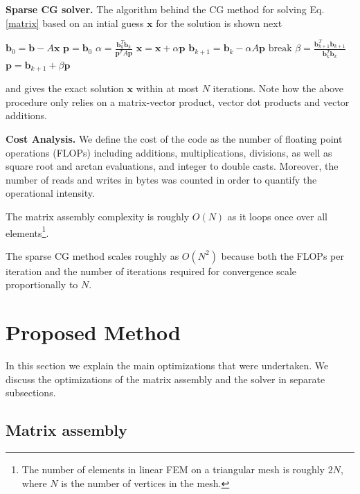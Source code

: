 \documentclass[letterpaper]{article}
\newcommand{\mypar}[1]{{\bf #1.}}
\begin{document}
\mypar{Sparse CG solver}
The algorithm behind the CG method for solving Eq. \eqref{matrix} based on an intial guess $\mathbf{x}$ for the solution is shown next
\begin{algorithmic}
\State $\mathbf{b}_0 = \mathbf{b}-A\mathbf{x}$
\State $\mathbf{p}   = \mathbf{b}_0$ 
\State $\alpha = \frac{\mathbf{b}_k^T\mathbf{b}_k}{\mathbf{p}^T A \mathbf{p}} $
\State $\mathbf{x} = \mathbf{x} + \alpha \mathbf{p}$
\State $\mathbf{b}_{k+1} = \mathbf{b}_k - \alpha A \mathbf{p}$ 
\State $\text{break}$ 
\EndIf
\State $\beta = \frac{\mathbf{b}_{k+1}^T \mathbf{b}_{k+1}}{\mathbf{b}_k^T\mathbf{b}_k}$
\State $\mathbf{p} = \mathbf{b}_{k+1} + \beta \mathbf{p}$
\EndFor
\end{algorithmic}
and gives the exact solution $\mathbf{x}$ within at most $N$ iterations. Note how the above procedure only relies on a matrix-vector product, vector dot products and vector additions.

\mypar{Cost Analysis}
We define the cost of the code as the number of floating point operations (FLOPs) including additions, multiplications, divisions, as well as square root and arctan evaluations, and integer to double casts. Moreover, the number of reads and writes in bytes was counted in order to quantify the operational intensity.

The matrix assembly complexity is roughly $O(N)$ as it loops once over all elements\footnote{The number of elements in linear FEM on a triangular mesh is roughly $2N$, where $N$ is the number of vertices in the mesh.}. 

The sparse CG method scales roughly as $O(N^2)$ because both the FLOPs per iteration and the number of iterations required for convergence scale proportionally to $N$.


\section{Proposed Method}\label{sec:yourmethod}

In this section we explain the main optimizations that were undertaken.
We discuss the optimizations of the matrix assembly and the solver in separate subsections.

\subsection{Matrix assembly}\label{subsec:assembly}
\end{document}
